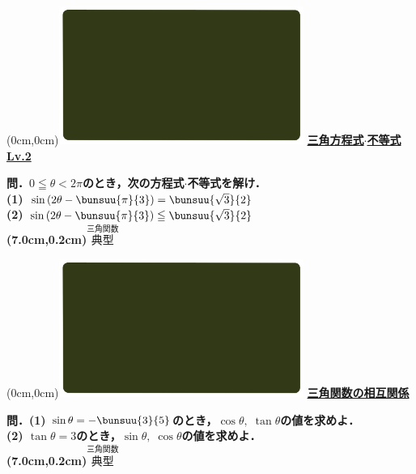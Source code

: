 \documentclass[10pt,
fleqn,
dvipdfmx,
uplatex
]{jsarticle}
\begin{document}
\newpage



\at(0cm,0cm){\includegraphics[width=8cm,bb=0 0 1920 1080]{./youtube/thumbnails/templates/smart_background/三角関数.jpeg}}
{\color{orange}\bf\boldmath\Large\underline{三角方程式$\cdot$不等式 Lv.2 }}\vspace{0.3zw}

\Large 
\bf\boldmath 問．$0\leqq \theta <2\pi$のとき，次の方程式$\cdot$不等式を解け．\\
(1)  $\sin \left(2\theta -\bunsuu{\pi }{3}\right)=\bunsuu{{\sqrt 3}}{2}$\\
(2)  $\sin \left(2\theta -\bunsuu{\pi }{3}\right)\leqq \bunsuu{{\sqrt 3}}{2}$\\

\at(7.0cm,0.2cm){\small\color{bradorange}$\overset{\text{三角関数}}{\text{典型}}$}


\newpage



\at(0cm,0cm){\includegraphics[width=8cm,bb=0 0 1920 1080]{./youtube/thumbnails/templates/smart_background/三角関数.jpeg}}
{\color{orange}\bf\boldmath\LARGE\underline{三角関数の相互関係}}\vspace{0.3zw}

\Large 
\bf\boldmath 問．(1)  $\sin \theta =-\bunsuu{3}{5}$のとき，$\cos \theta ,\;\tan \theta$の値を求めよ．\\
(2)  $\tan \theta =3$のとき，$\sin \theta ,\;\cos \theta$の値を求めよ．\\

\at(7.0cm,0.2cm){\small\color{bradorange}$\overset{\text{三角関数}}{\text{典型}}$}
\end{document}
